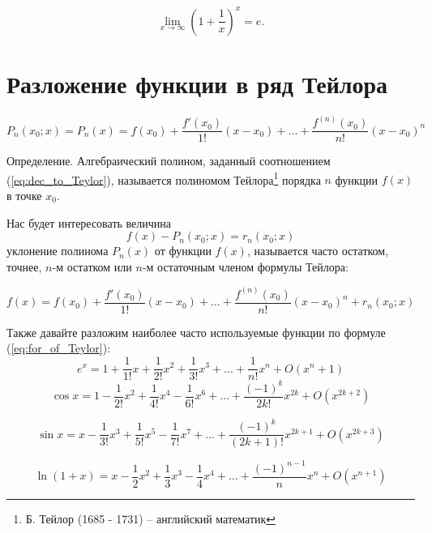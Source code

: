 \documentclass[a4paper, 12pt]{article} %
\begin{document}
\begin{equation}
    \lim _{{x\to \infty }}\left(1+{\frac  {1}{x}}\right)^{x}=e.
\end{equation}

\clearpage


\section*{Разложение функции в ряд Тейлора}

\begin{equation}
    P_n(x_0; x) = P_n(x) = f(x_0) + \frac{f'(x_0)}{1!}(x - x_0) + ... + \frac{f^{(n)}(x_0)}{n!}(x - x_0)^n
    \label{eq:dec_to_Teylor}
\end{equation}

Определение. Алгебраический полином, заданный соотношением (\ref{eq:dec_to_Teylor}), называется полиномом Тейлора\footnote{Б. Тейлор (1685 - 1731) -- английский математик} порядка $n$ функции $f(x)$ в точке $x_0$.

Нас будет интересовать величина
\begin{equation}
    f(x) - P_n(x_0; x) = r_n(x_0; x)
\end{equation}
уклонение полинома $P_n(x)$ от функции $f(x)$, называется часто остатком, точнее, $n$-м остатком или $n$-м остаточным членом формулы Тейлора:

\begin{equation}
    f(x) = f(x_0) + \frac{f'(x_0)}{1!} (x - x_0) + ... + \frac{f^{(n)}(x_0)}{n!} (x - x_0)^n + r_n (x_0; x)
    \label{eq:for_of_Teylor}
\end{equation}

Также давайте разложим наиболее часто используемые функции по формуле (\ref{eq:for_of_Teylor}):
\begin{equation}
    e^x = 1 + \frac{1}{1!}x + \frac{1}{2!}x^2 + \frac{1}{3!}x^3 + ... + \frac{1}{n!}x^n + O(x^n + 1)
\end{equation}
\begin{equation}
    \cos x = 1 - \frac{1}{2!}x^2 + \frac{1}{4!}x^4 - \frac{1}{6!}x^6 + ... + \frac{(-1)^k}{2k!}x^{2k} + O(x^{2k+2})
\end{equation}

\begin{equation}
    \sin x = x - \frac{1}{3!}x^3 + \frac{1}{5!}x^5 - \frac{1}{7!}x^7 + ... + \frac{(-1)^k}{(2k + 1)!}x^{2k + 1} + O(x^{2k+3})
\end{equation}

\begin{equation}
    \ln(1 + x) = x - \frac{1}{2}x^2 + \frac{1}{3}x^3 - \frac{1}{4}x^4 + ... + \frac{(-1)^{n - 1}}{n}x^n + O(x^{n + 1})
\end{equation}
\end{document}
